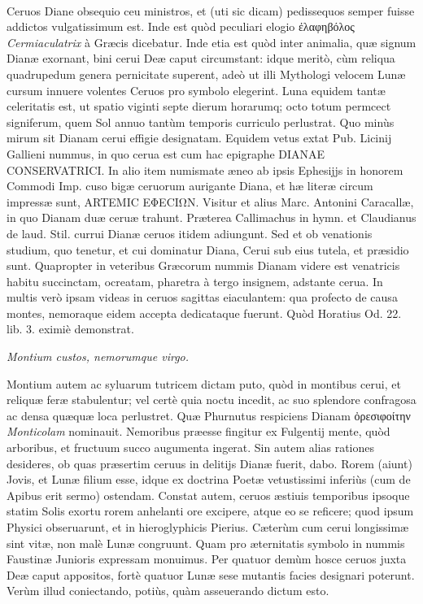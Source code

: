 \documentclass[a4paper, 11pt, oneside, polutonikogreek, latin]{article}
\begin{document}
\paragraph{}
Ceruos Diane obsequio ceu ministros, et (uti sic dicam) pedissequos semper fuisse addictos vulgatissimum est. Inde est quòd peculiari elogio ἐλαφηβόλος \emph{Cermiaculatrix} à Græcis dicebatur. Inde etia est quòd inter animalia, quæ signum Dianæ exornant, bini cerui Deæ caput circumstant: idque meritò, cùm reliqua quadrupedum genera pernicitate superent, adeò ut illi Mythologi velocem Lunæ cursum innuere volentes Ceruos pro symbolo elegerint. Luna equidem tantæ celeritatis est, ut spatio viginti septe dierum horarumq; octo totum permcect signiferum, quem Sol annuo tantùm temporis curriculo perlustrat. Quo minùs mirum sit Dianam cerui effigie designatam. Equidem vetus extat Pub. Licinij Gallieni nummus, in quo cerua est cum hac epigraphe DIANAE CONSERVATRICI. In alio item numismate æneo ab ipsis Ephesijjs in honorem Commodi Imp. cuso bigæ ceruorum aurigante Diana, et hæ literæ circum impressæ sunt, ARTEMIC EΦECIΩN. Visitur et alius Marc. Antonini Caracallæ, in quo Dianam duæ ceruæ trahunt. Præterea Callimachus in hymn. et Claudianus de laud. Stil. currui Dianæ ceruos itidem adiungunt. Sed et ob venationis studium, quo tenetur, et cui dominatur Diana, Cerui sub eius tutela, et præsidio sunt. Quapropter in veteribus Græcorum nummis Dianam videre est venatricis habitu succinctam, ocreatam, pharetra à tergo insignem, adstante cerua. In multis verò ipsam videas in ceruos sagittas eiaculantem: qua profecto de causa montes, nemoraque eidem accepta dedicataque fuerunt. Quòd Horatius Od. 22. lib. 3. eximiè demonstrat.

\emph{Montium custos, nemorumque virgo.}

Montium autem ac syluarum tutricem dictam puto, quòd in montibus cerui, et reliquæ feræ stabulentur; vel certè quia noctu incedit, ac suo splendore confragosa ac densa quæquæ loca perlustret. Quæ Phurnutus respiciens Dianam ὀρεσιφοίτην \emph{Monticolam} nominauit. Nemoribus præesse fingitur ex Fulgentij mente, quòd arboribus, et fructuum succo augumenta ingerat. Sin autem alias rationes desideres, ob quas præsertim ceruus in delitijs Dianæ fuerit, dabo. Rorem (aiunt) Jovis, et Lunæ filium esse, idque ex doctrina Poetæ vetustissimi inferiùs (cum de Apibus erit sermo) ostendam. Constat autem, ceruos æstiuis temporibus ipsoque statim Solis exortu rorem anhelanti ore excipere, atque eo se reficere; quod ipsum Physici obseruarunt, et in hieroglyphicis Pierius. Cæterùm cum cerui longissimæ sint vitæ, non malè Lunæ congruunt. Quam pro æternitatis symbolo in nummis Faustinæ Junioris expressam monuimus. Per quatuor demùm hosce ceruos juxta Deæ caput appositos, fortè quatuor Lunæ sese mutantis facies designari poterunt. Verùm illud coniectando, potiùs, quàm asseuerando dictum esto.
\clearpage
\end{document}
